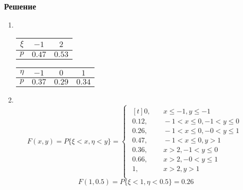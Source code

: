 \documentclass[12pt]{article}
\begin{document}
\subsubsection*{Решение}
\begin{enumerate}
	\item \mbox{}\\
	      \begin{tabular}{|c|c|c|}
		      \hline
		      $\xi $ & $-1$   & $2$    \\
		      \hline
		      $p$    & $0.47$ & $0.53$ \\
		      \hline
	      \end{tabular}
	      \begin{tabular}{|c|c|c|c|}
		      \hline
		      $\eta $ & $-1$   & $0$    & $1$    \\
		      \hline
		      $p$     & $0.37$ & $0.29$ & $0.34$ \\
		      \hline
	      \end{tabular}

	\item \mbox{}\\
	      \begin{equation*}
		      F(x, y) = P\{\xi < x, \eta < y\} =
		      \begin{cases}
			      \begin{aligned}[t]
				      0,    & \quad x \leq -1, y \leq -1         \\
				      0.12, & \quad -1 < x \leq 0, -1 < y \leq 0 \\
				      0.26, & \quad -1 < x \leq 0, -0 < y \leq 1 \\
				      0.47, & \quad -1 < x \leq 0, y > 1         \\
				      0.36, & \quad x > 2, -1 < y \leq 0         \\
				      0.66, & \quad x > 2, -0 < y \leq 1         \\
				      1,    & \quad x > 2, y > 1                 \\
			      \end{aligned}
		      \end{cases}
	      \end{equation*}
	      \begin{equation*}
		      F(1, 0.5) = P\{\xi < 1, \eta < 0.5\} = 0.26
	      \end{equation*}


\end{enumerate}
\end{document}
